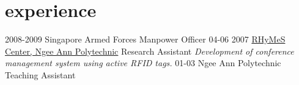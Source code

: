 \documentclass[]{friggeri-cv}
\begin{document}
\section{experience}

\begin{entrylist}
	\entry
	{2008-2009}
	{Singapore Armed Forces}
	{Manpower Officer}
	{}
	\entry
	{04-06 2007}
	{\href{http://www.np.edu.sg/ict/facilities/rhymes/Pages/loc\_rhymes.aspx}{RHyMeS Center, Ngee Ann Polytechnic}}
	{Research Assistant}
	{\emph{Development of conference management system using active RFID tags.}}
	\entry
	{01-03}
	{Ngee Ann Polytechnic}
	{Teaching Assistant}
	{}
\end{entrylist}

\end{document}
